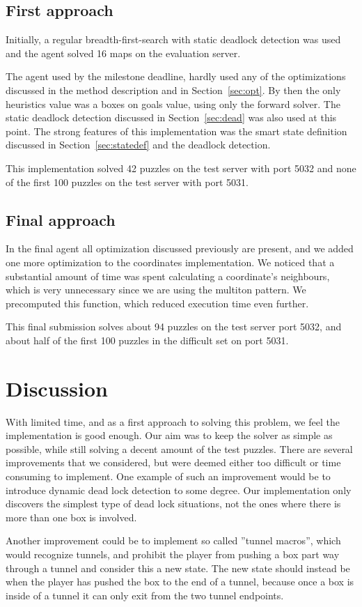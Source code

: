 \documentclass[a4paper,11pt]{article}
\begin{document}
\subsection{First approach}
Initially, a regular breadth-first-search with static deadlock detection was used and the agent solved 16 maps on the evaluation server. 

The agent used by the milestone deadline, hardly used any of the optimizations discussed in the method description and in Section~\ref{sec:opt}.
By then the only heuristics value was a boxes on goals value, using only the forward solver. 
The static deadlock detection discussed in Section~\ref{sec:dead} was also used at this point.
The strong features of this implementation was the smart state definition discussed in Section~\ref{sec:statedef} and the deadlock detection. 

This implementation solved 42 puzzles on the test server with port 5032 and none of the first 100 puzzles on the 
test server with port 5031. 

\subsection{Final approach}

In the final agent all optimization discussed previously are present,
and we added one more optimization to the coordinates implementation.
We noticed that a substantial amount of time was spent calculating
a coordinate's neighbours, which is very unnecessary since
we are using the multiton pattern.
We precomputed this function, which reduced execution time even further.

This final submission solves about 94 puzzles on the test server port 5032,
and about half of the first 100 puzzles in the difficult set on port 5031.

\section{Discussion}

With limited time, and as a first approach to solving this problem,
we feel the implementation is good enough.
Our aim was to keep the solver as simple as possible,
while still solving a decent amount of the test puzzles.
There are several improvements that we considered, but were
deemed either too difficult or time consuming to implement.
One example of such an improvement would be to introduce dynamic
dead lock detection to some degree.
Our implementation only discovers the simplest type of dead lock situations,
not the ones where there is more than one box is involved.

Another improvement could be to implement so called ''tunnel macros'',
which would recognize tunnels, and prohibit the player
from pushing a box part way through a tunnel and consider this a new state.
The new state should instead be when the player has pushed the box to the end of a tunnel,
because once a box is inside of a tunnel it can only exit from the two tunnel endpoints.
\end{document}
